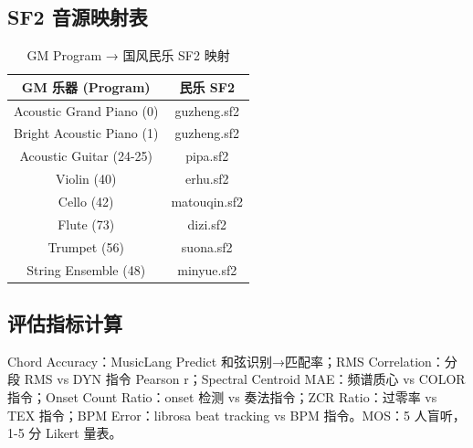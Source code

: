 \documentclass[11pt,twocolumn]{article}
\begin{document}
\subsection{SF2 音源映射表}
\begin{table}[H]
\centering\footnotesize
\caption{GM Program → 国风民乐 SF2 映射}
\begin{tabular}{c|c}
\toprule
GM 乐器 (Program) & 民乐 SF2 \\
\midrule
Acoustic Grand Piano (0) & guzheng.sf2 \\
Bright Acoustic Piano (1) & guzheng.sf2 \\
Acoustic Guitar (24-25) & pipa.sf2 \\
Violin (40) & erhu.sf2 \\
Cello (42) & matouqin.sf2 \\
Flute (73) & dizi.sf2 \\
Trumpet (56) & suona.sf2 \\
String Ensemble (48) & minyue.sf2 \\
\bottomrule
\end{tabular}
\end{table}

\subsection{评估指标计算}
Chord Accuracy：MusicLang Predict 和弦识别→匹配率；RMS Correlation：分段 RMS vs DYN 指令 Pearson r；Spectral Centroid MAE：频谱质心 vs COLOR 指令；Onset Count Ratio：onset 检测 vs 奏法指令；ZCR Ratio：过零率 vs TEX 指令；BPM Error：librosa beat tracking vs BPM 指令。MOS：5 人盲听，1-5 分 Likert 量表。
\end{document}
